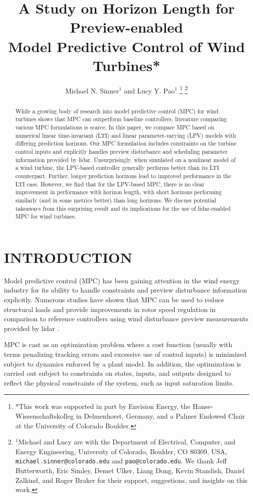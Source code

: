 \documentclass[letterpaper, 10 pt, conference]{ieeeconf}  %
\title{\LARGE \bf A Study on Horizon Length for Preview-enabled \\ Model Predictive Control of Wind Turbines*
}
\author{Michael N. Sinner$^{1}$ and Lucy Y. Pao$^{1}$%
	\thanks{*This work was supported in part by Envision Energy, the Hanse-Wissenschaftskolleg in Delmenhorst, Germany, and a Palmer Endowed Chair at the University of Colorado Boulder.}%
	\thanks{$^{1}$Michael and Lucy are with the Department of Electrical, Computer, and Energy Engineering,
		University of Colorado, Boulder, CO 80309, USA,
		{\tt\small michael.sinner@colorado.edu} and {\tt\small pao@colorado.edu}. We thank Jeff Butterworth, Eric Simley, Demet Ulker, Liang Dong, Kevin Standish, Daniel Zalkind, and Roger Braker for their support, suggestions, and insights on this work.}}
\begin{document}
		
\maketitle
\thispagestyle{empty}
\pagestyle{empty}

\begin{abstract}

While a growing body of research into model predictive control (MPC) for wind turbines shows that MPC can outperform baseline controllers, literature comparing various MPC formulations is scarce. In this paper, we compare MPC based on numerical linear time-invariant (LTI) and linear parameter-varying (LPV) models with differing prediction horizons. Our MPC formulation includes constraints on the turbine control inputs and explicitly handles preview disturbance and scheduling parameter information provided by lidar. Unsurprisingly, when simulated on a nonlinear model of a wind turbine, the LPV-based controller generally performs better than its LTI counterpart. Further, longer prediction horizons lead to improved performance in the LTI case. However, we find that for the LPV-based MPC, there is no clear improvement in performance with horizon length, with short horizons performing similarly (and in some metrics better) than long horizons. We discuss potential takeaways from this surprising result and its implications for the use of lidar-enabled MPC for wind turbines. 

\end{abstract}


\section{INTRODUCTION}\label{sec:Intro}

Model predictive control (MPC) has been gaining attention in the wind energy industry for its ability to handle constraints and preview disturbance information explicitly. Numerous studies  have shown that MPC can be used to reduce structural loads \cite{Bottasso2014}\cite{Soltani2011} and provide improvements in rotor speed regulation \cite{Raach2014}\cite{Mirzaei2016}\cite{Lio2017} in comparison to reference controllers using wind disturbance preview measurements provided by lidar \cite{Schlipf_lidar2015}. 

MPC is cast as an optimization problem where a cost function (usually with terms penalizing tracking errors and excessive use of control inputs) is minimized subject to dynamics enforced by a plant model. In addition, the optimization is carried out subject to constraints on states, inputs, and outputs designed to reflect the physical constraints of the system, such as input saturation limits.
\end{document}
